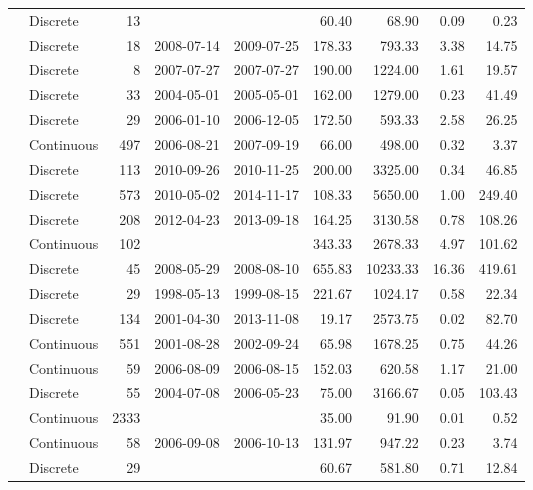 \begin{table}[ht]
\begin{tabular}{llrllrrrr}
  \citet{Gonnelli2016} & Discrete &  13 &  &  & 60.40 & 68.90 & 0.09 & 0.23 \\ 
  \citet{Griffin2011} & Discrete &  18 & 2008-07-14 & 2009-07-25 & 178.33 & 793.33 & 3.38 & 14.75 \\ 
  \citet{Gueguen2011} & Discrete &   8 & 2007-07-27 & 2007-07-27 & 190.00 & 1224.00 & 1.61 & 19.57 \\ 
  \citet{Helms2008} & Discrete &  33 & 2004-05-01 & 2005-05-01 & 162.00 & 1279.00 & 0.23 & 41.49 \\ 
  \citet{Hernes2008} & Discrete &  29 & 2006-01-10 & 2006-12-05 & 172.50 & 593.33 & 2.58 & 26.25 \\ 
  \citet{kattegat} & Continuous & 497 & 2006-08-21 & 2007-09-19 & 66.00 & 498.00 & 0.32 & 3.37 \\ 
  \citet{Kellerman2015} & Discrete & 113 & 2010-09-26 & 2010-11-25 & 200.00 & 3325.00 & 0.34 & 46.85 \\ 
  \citet{Lambert2015a} & Discrete & 573 & 2010-05-02 & 2014-11-17 & 108.33 & 5650.00 & 1.00 & 249.40 \\ 
  \citet{Loken2016} & Discrete & 208 & 2012-04-23 & 2013-09-18 & 164.25 & 3130.58 & 0.78 & 108.26 \\ 
  \citet{lter2004} & Continuous & 102 &  &  & 343.33 & 2678.33 & 4.97 & 101.62 \\ 
  \citet{lter2008} & Discrete &  45 & 2008-05-29 & 2008-08-10 & 655.83 & 10233.33 & 16.36 & 419.61 \\ 
  \citet{lter5653} & Discrete &  29 & 1998-05-13 & 1999-08-15 & 221.67 & 1024.17 & 0.58 & 22.34 \\ 
  \citet{lter5689} & Discrete & 134 & 2001-04-30 & 2013-11-08 & 19.17 & 2573.75 & 0.02 & 82.70 \\ 
  \citet{Markager2011} & Continuous & 551 & 2001-08-28 & 2002-09-24 & 65.98 & 1678.25 & 0.75 & 44.26 \\ 
  \citet{Massicotte2011EA} & Continuous &  59 & 2006-08-09 & 2006-08-15 & 152.03 & 620.58 & 1.17 & 21.00 \\ 
  \citet{Moran2006} & Discrete &  55 & 2004-07-08 & 2006-05-23 & 75.00 & 3166.67 & 0.05 & 103.43 \\ 
  \citet{Nelson2002, Nelson2007, Nelson2010} & Continuous & 2333 &  &  & 35.00 & 91.90 & 0.01 & 0.52 \\ 
  \citet{Norman2011} & Continuous &  58 & 2006-09-08 & 2006-10-13 & 131.97 & 947.22 & 0.23 & 3.74 \\ 
  \citet{Oestreich2016} & Discrete &  29 &  &  & 60.67 & 581.80 & 0.71 & 12.84 \\ 

\end{tabular}
\end{table}
